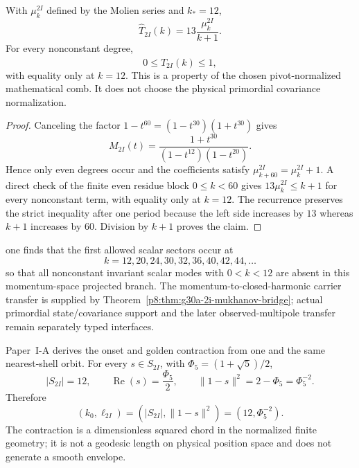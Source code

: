 \documentclass[12pt,a4paper]{article}
\begin{document}
\begin{proposition}
\label{p8:prop:v191-2i-comb-nonamplifying}
With $\mu_k^{2I}$ defined by the Molien series and $k_*=12$,
\[
 \widehat T_{2I}(k)=13\frac{\mu_k^{2I}}{k+1}.
\]
For every nonconstant degree,
\[
 \boxed{0\le\widehat T_{2I}(k)\le1,}
\]
with equality only at $k=12$.  This is a property of the chosen
pivot-normalized mathematical comb.  It does not choose the physical
primordial covariance normalization.
\end{proposition}

\begin{proof}
Canceling the factor $1-t^{60}=(1-t^{30})(1+t^{30})$ gives
\[
 M_{2I}(t)=\frac{1+t^{30}}{(1-t^{12})(1-t^{20})}.
\]
Hence only even degrees occur and the coefficients satisfy
$\mu_{k+60}^{2I}=\mu_k^{2I}+1$.  A direct check of the finite even residue
block $0\le k<60$ gives $13\mu_k^{2I}\le k+1$ for every nonconstant term,
with equality only at $k=12$.  The recurrence preserves the strict
inequality after one period because the left side increases by $13$ whereas
$k+1$ increases by $60$.  Division by $k+1$ proves the claim.
\end{proof}

one finds that the first allowed scalar sectors occur at
\[
k=12,20,24,30,32,36,40,42,44,\dots
\]
so that all nonconstant invariant scalar modes with \(0<k<12\) are absent in this momentum-space projected branch.  The momentum-to-closed-harmonic carrier transfer is supplied by Theorem~\ref{p8:thm:g30a-2i-mukhanov-bridge}; actual primordial state/covariance support and the later observed-multipole transfer remain separately typed interfaces.

Paper~I-A derives the onset and golden contraction from one and the same
nearest-shell orbit.  For every \(s\in S_{2I}\), with
\(\Phi_5=(1+\sqrt5)/2\),
\[
 |S_{2I}|=12,\qquad
 \operatorname{Re}(s)=\frac{\Phi_5}{2},\qquad
 \|1-s\|^2=2-\Phi_5=\Phi_5^{-2}.
\]
Therefore
\begin{equation}
\label{p8:eq:2I-one-shell-datum}
 \boxed{(k_0,\ell_{2I})
 =\left(|S_{2I}|,\|1-s\|^2\right)
 =(12,\Phi_5^{-2}).}
\end{equation}
The contraction is a dimensionless squared chord in the normalized finite
geometry; it is not a geodesic length on physical position space and does not
generate a smooth envelope.
\end{document}
